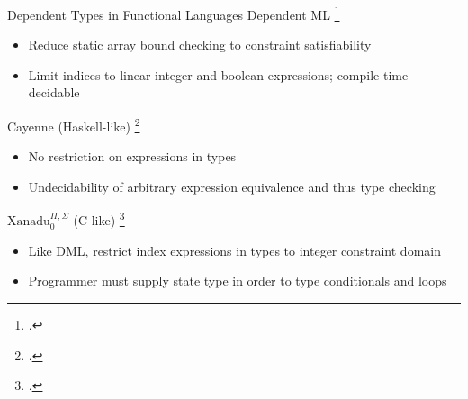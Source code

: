 \documentclass[aspectratio=169]{beamer}
\begin{document}
\begin{frame}{Dependent Types in Functional Languages}
\vspace{-0.1in}
Dependent ML \footcite{xi_eliminating_1998}
\begin{itemize}
    \item Reduce static array bound checking to constraint satisfiability
    \item Limit indices to linear integer and boolean expressions; compile-time decidable
\end{itemize}
Cayenne (Haskell-like) \footcite{augustsson_cayennelanguage_1998}
\begin{itemize}
    \item No restriction on expressions in types
    \item Undecidability of arbitrary expression equivalence and thus type checking
\end{itemize}
$\text{Xanadu}_{0}^{\Pi,\Sigma}$ (C-like) \footcite{xi_imperative_2000}
\begin{itemize}
    \item Like DML, restrict index expressions in types to integer constraint domain
    \item Programmer must supply state type in order to type conditionals and loops
\end{itemize}
    \vspace{0.2in}
\end{frame}

\end{document}
